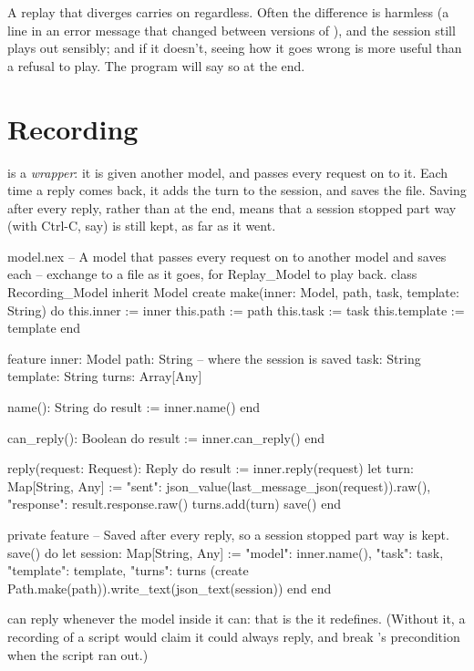 A replay that diverges carries on regardless. Often the difference is
harmless (a line in an error message that changed between versions of
), and the session still plays out sensibly; and if it doesn't,
seeing how it goes wrong is more useful than a refusal to play. The program
will say so at the end.

\section{Recording}

 is a \emph{wrapper}: it is given another model, and
passes every request on to it. Each time a reply comes back, it adds the
turn to the session, and saves the file. Saving after every reply, rather
than at the end, means that a session stopped part way (with Ctrl-C,
say) is still kept, as far as it went.

\begin{append}{model.nex}
-- A model that passes every request on to another model and saves each
-- exchange to a file as it goes, for Replay_Model to play back.
class Recording_Model inherit Model
create
  make(inner: Model, path, task, template: String) do
    this.inner := inner
    this.path := path
    this.task := task
    this.template := template
  end

feature
  inner: Model
  path: String         -- where the session is saved
  task: String
  template: String
  turns: Array[Any]

  name(): String do
    result := inner.name()
  end

  can_reply(): Boolean do
    result := inner.can_reply()
  end

  reply(request: Request): Reply do
    result := inner.reply(request)
    let turn: Map[String, Any] := {
      "sent": json_value(last_message_json(request)).raw(),
      "response": result.response.raw()
    }
    turns.add(turn)
    save()
  end

  private feature
    -- Saved after every reply, so a session stopped part way is kept.
    save() do
      let session: Map[String, Any] := {"model": inner.name(), "task": task,
        "template": template, "turns": turns}
      (create Path.make(path)).write_text(json_text(session))
    end
end
\end{append}

 can reply whenever the model inside it can: that is
the  it redefines. (Without it, a recording of a script
would claim it could always reply, and break 's precondition
when the script ran out.)

